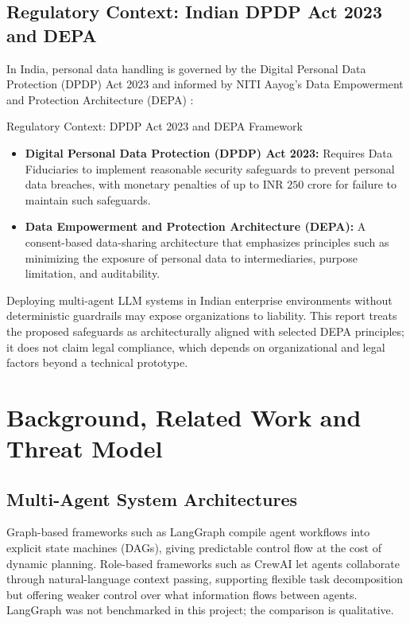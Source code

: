 \documentclass[11pt,a4paper]{article}
\begin{document}
\subsection{Regulatory Context: Indian DPDP Act 2023 and DEPA}
In India, personal data handling is governed by the Digital Personal Data Protection (DPDP) Act 2023 \cite{dpdp2023} and informed by NITI Aayog's Data Empowerment and Protection Architecture (DEPA) \cite{depa2020}:
\begin{regulatorybox}{Regulatory Context: DPDP Act 2023 and DEPA Framework}
\begin{itemize}
    \item \textbf{Digital Personal Data Protection (DPDP) Act 2023:} Requires Data Fiduciaries to implement reasonable security safeguards to prevent personal data breaches, with monetary penalties of up to INR $250$ crore for failure to maintain such safeguards.
    \item \textbf{Data Empowerment and Protection Architecture (DEPA):} A consent-based data-sharing architecture that emphasizes principles such as minimizing the exposure of personal data to intermediaries, purpose limitation, and auditability.
\end{itemize}
\end{regulatorybox}

Deploying multi-agent LLM systems in Indian enterprise environments without deterministic guardrails may expose organizations to liability. This report treats the proposed safeguards as architecturally aligned with selected DEPA principles; it does not claim legal compliance, which depends on organizational and legal factors beyond a technical prototype.

\section{Background, Related Work and Threat Model}

\subsection{Multi-Agent System Architectures}
Graph-based frameworks such as LangGraph compile agent workflows into explicit state machines (DAGs), giving predictable control flow at the cost of dynamic planning. Role-based frameworks such as CrewAI \cite{crewai2024} let agents collaborate through natural-language context passing, supporting flexible task decomposition but offering weaker control over what information flows between agents. LangGraph was not benchmarked in this project; the comparison is qualitative.
\end{document}
